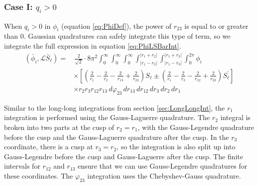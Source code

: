 \documentclass[Dissertation.tex]{subfiles}
\begin{document}
\subsubsection{Case I: \texorpdfstring{$q_i > 0$}{qi > 0}}
\label{sec:Swaveqigt0}
When $q_i > 0$ in $\phi_i$ (equation \ref{eq:PhiDef}), the power of $r_{23}$ is
equal to or greater than 0. Gaussian quadratures can safely integrate this type
of term, so we integrate the full expression in equation \ref{eq:PhiLSBarInt}.
\begin{align}
\label{eq:PhiLSBarIntFull}
\nonumber (\bar{\phi}_i, \mathcal{L} \bar{S}_\ell) =& \, \frac{2}{\sqrt{2}} \cdot 8\pi^2  \int_0^\infty \int_0^\infty \int_0^\infty \int_{|r_1 - r_2|}^{|r_1 + r_2|} \int_{|r_1 - r_3|}^{|r_1 + r_3|} \int_0^{2\pi} \phi_i \\
&\times \left[ \left( \frac{2}{r_1} - \frac{2}{r_2} - \frac{2}{r_{13}} + \frac{2}{r_{23}} \right)S_\ell \pm \left( \frac{2}{r_1} - \frac{2}{r_3} - \frac{2}{r_{12}} + \frac{2}{r_{23}} \right) S_\ell^\prime \right] \\
&\times r_2 r_3 r_{12} r_{13}\, d\varphi_{23}\, dr_{13}\, dr_{12}\, dr_3\, dr_2\, dr_1
\end{align}

Similar to the long-long integrations from section \ref{sec:LongLongInt}, the 
$r_1$ integration is performed using the Gauss-Laguerre quadrature. The $r_2$
integral is broken into two parts at the cusp of $r_2 = r_1$, with the
Gauss-Legendre quadrature before the cusp and the Gauss-Laguerre quadrature 
after the cusp. In the $r_3$ coordinate, there is a cusp at $r_3 = r_2$, so 
the integration is also split up into Gauss-Legendre before the cusp and
Gauss-Laguerre after the cusp. The finite intervals for $r_{12}$ and $r_{13}$ 
ensure that we can use Gauss-Legendre quadratures for these coordinates. The 
$\varphi_{23}$ integration uses the Chebyshev-Gauss quadrature.
\end{document}
